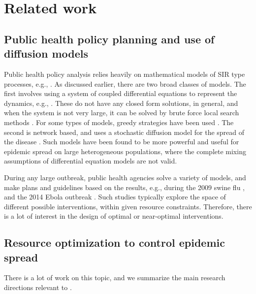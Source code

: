 \section{Related work}
\label{sec:related}

\subsection{Public health policy planning and use of diffusion models}
Public health policy analysis relies heavily on mathematical models of SIR type processes, e.g., \cite{lofgren:pnas14,anderson+m:book}. As discussed earlier, there are two broad classes of models. The first involves using a system of coupled differential equations to represent the dynamics, e.g., \cite{medlock:science09,AAAI1816714,venkataramanan:ichi17}. These do not have any closed form solutions, in general, and when the system is not very large, it can be solved by brute force local search methods \cite{medlock:science09}. For some types of models, greedy strategies have been used \cite{AAAI1816714,venkataramanan:ichi17}. 
The second is network based, and uses a stochastic diffusion model for the spread of the disease \cite{marathe:cacm13,halloran:pnas08,lofgren:pnas14,eubank:nature04,gk06}. Such models have been found to be more powerful and useful for epidemic spread on large heterogeneous populations, where the complete mixing assumptions of differential equation models are not valid.

During any large outbreak, public health agencies solve a variety of models, and make plans and guidelines based on the results,
e.g., during the 2009 swine flu \cite{medlock:science09}, and
the 2014 Ebola outbreak \cite{lofgren:pnas14}. Such studies typically explore the space of different possible interventions, within given resource constraints. Therefore, there is a lot of interest in the design of optimal or near-optimal interventions.

\subsection{Resource optimization to control epidemic spread}
There is a lot of work on this topic, and we summarize the main research directions relevant to \prob{}.

